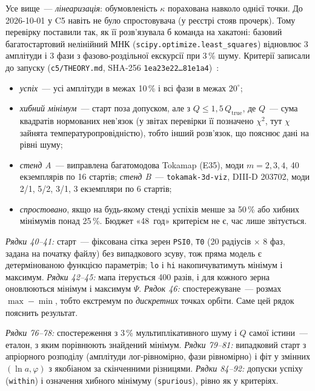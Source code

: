 Усе вище~--- \emph{лінеаризація}: обумовленість $\kappa$ порахована навколо однієї точки. До 2026-10-01 у C5 навіть не було спростовувача (у реєстрі стояв прочерк). Тому перевірку поставили так, як її розв'язувала б команда на хакатоні: базовий багатостартовий нелінійний МНК (\texttt{scipy.optimize.least\_squares}) відновлює 3 амплітуди і 3 фази з фазово-роздільної екскурсії при 3\,\% шуму. Критерії записали до запуску (\texttt{c5/THEORY.md}, SHA-256 \texttt{1ea23e22\ldots81e1a4})~\cite{RegConj,g07C5}:
\begin{itemize}
\item \emph{успіх}~--- усі амплітуди в межах 10\,\% і всі фази в межах $20^\circ$;
\item \emph{хибний мінімум}~--- старт поза допуском, але з $Q\le1{,}5\,Q_{\mathrm{true}}$, де $Q$~--- сума квадратів нормованих нев'язок (у звітах перевірки її позначено $\chi^2$, тут $\chi$ зайнята температуропровідністю), тобто інший розв'язок, що пояснює дані на рівні шуму;  %
\item \emph{стенд A}~--- виправлена багатомодова Tokamap (E35), моди $m=2,3,4$, 40 екземплярів по 16 стартів; \emph{стенд B}~--- \texttt{tokamak-3d-viz}, DIII-D 203702, моди 2/1, 5/2, 3/1, 3 екземпляри по 6 стартів;
\item \emph{спростовано}, якщо на будь-якому стенді успіхів менше за 50\,\% або хибних мінімумів понад 25\,\%. Бюджет «48~год» критерієм не є, час лише звітується.
\end{itemize}


\noindent\emph{Рядки 40--41:} старт~--- фіксована сітка зерен \texttt{PSI0}, \texttt{T0} (20 радіусів $\times$ 8 фаз, задана на початку файлу) без випадкового зсуву, тож пряма модель є детермінованою функцією параметрів; \texttt{lo} і \texttt{hi} накопичуватимуть мінімум і максимум. \emph{Рядки 42--45:} мапа ітерується 400 разів, і для кожного зерна оновлюються мінімум і максимум $\Psi$. \emph{Рядок 46:} спостережуване~--- розмах $\max-\min$, тобто екстремум по \emph{дискретних} точках орбіти. Саме цей рядок пояснить результат.


\noindent\emph{Рядки 76--78:} спостереження з 3\,\% мультиплікативного шуму і $Q$ самої істини~--- еталон, з яким порівнюють знайдений мінімум. \emph{Рядки 79--81:} випадковий старт з апріорного розподілу (амплітуди лог-рівномірно, фази рівномірно) і фіт у змінних $(\ln a,\varphi)$ з якобіаном за скінченними різницями. \emph{Рядки 84--92:} допуски успіху (\texttt{within}) і означення хибного мінімуму (\texttt{spurious}), рівно як у критеріях.

